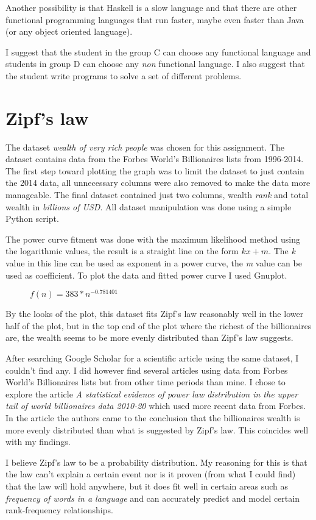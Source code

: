 \documentclass[11pt, a4paper]{article}
\begin{document}
Another possibility is that Haskell is a slow language and that there are other functional programming languages that run faster,
maybe even faster than Java (or any object oriented language).

I suggest that the student in the group C can choose any functional language and students in group D can choose any \textit{non}
functional language. I also suggest that the student write programs to solve a set of different problems.

\section{Zipf's law}

The dataset \textit{wealth of very rich people}\cite{dataset} was chosen for this assignment.
The dataset contains data from the Forbes World's Billionaires lists from 1996-2014.
The first step toward plotting the graph was to limit the dataset to just contain the 2014 data, all unnecessary columns were also removed
to make the data more manageable. The final dataset contained just two columns, wealth \textit{rank} and total wealth in \textit{billions of USD}.
All dataset manipulation was done using a simple Python script.

The power curve fitment was done with the maximum likelihood method using the logarithmic values, the result is a straight line on the form $kx+m$.
The \textit{k} value in this line can be used as exponent in a power curve, the \textit{m} value can be used as coefficient.
To plot the data and fitted power curve I used Gnuplot.

\begin{figure}[h!]
	
	\caption{$f(n) = 383 * n^{-0.781401}$}
\end{figure}

By the looks of the plot, this dataset fits Zipf's law reasonably well in the lower half of the plot,
but in the top end of the plot where the richest of the billionaires are, the wealth seems to be more evenly distributed
than Zipf's law suggests.

After searching Google Scholar for a scientific article using the same dataset, I couldn't find any. I did however find several articles using data from
Forbes World's Billionaires lists but from other time periods than mine. I chose to explore the article 
\textit{A statistical evidence of power law distribution in the upper tail of world billionaires data 2010-20}\cite{article}
which used more recent data from Forbes. In the article the authors came to the conclusion that the billionaires wealth is more evenly 
distributed than what is suggested by Zipf's law. This coincides well with my findings.

I believe Zipf's law to be a probability distribution. My reasoning for this is that the law can't explain a certain event nor is it proven
(from what I could find) that the law will hold anywhere, but it does fit well in certain areas such as \textit{frequency of words in a language}
and can accurately predict and model certain rank-frequency relationships. 



\end{document}
